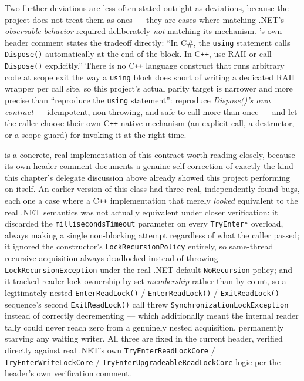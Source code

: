 Two further deviations are less often stated outright as deviations, because the project
does not treat them as ones --- they are cases where matching .NET's \emph{observable
behavior} required deliberately \emph{not} matching its mechanism. 's
own header comment states the tradeoff directly: ``In C\#, the \texttt{using} statement calls
\texttt{Dispose()} automatically at the end of the block. In C\texttt{++}, use RAII or call
\texttt{Dispose()} explicitly.'' There is no C\texttt{++} language construct that runs
arbitrary code at scope exit the way a \texttt{using} block does short of writing a dedicated
RAII wrapper per call site, so this project's actual parity target is narrower and more
precise than ``reproduce the \texttt{using} statement'': reproduce \emph{Dispose()'s own
contract} --- idempotent, non-throwing, and safe to call more than once --- and let the
caller choose their own C\texttt{++}-native mechanism (an explicit call, a destructor, or a
scope guard) for invoking it at the right time.

 is a concrete, real implementation of this
contract worth reading closely, because its own header comment documents a genuine
self-correction of exactly the kind this chapter's delegate discussion above already showed
this project performing on itself. An earlier version of this
class had three real, independently-found bugs, each one a case where a C\texttt{++}
implementation that merely \emph{looked} equivalent to the real .NET semantics was not
actually equivalent under closer verification: it discarded the
\texttt{millisecondsTimeout} parameter on every \texttt{TryEnter*} overload, always making a
single non-blocking attempt regardless of what the caller passed; it ignored the constructor's
\texttt{LockRecursionPolicy} entirely, so same-thread recursive acquisition always deadlocked
instead of throwing \texttt{LockRecursionException} under the real .NET-default
\texttt{NoRecursion} policy; and it tracked reader-lock ownership by set \emph{membership}
rather than by count, so a legitimately nested
\texttt{EnterReadLock()} / \texttt{EnterReadLock()} / \texttt{ExitReadLock()} sequence's second
\texttt{ExitReadLock()} call threw \texttt{SynchronizationLockException} instead of correctly
decrementing --- which additionally meant the internal reader tally could never reach zero
from a genuinely nested acquisition, permanently starving any waiting writer. All three are
fixed in the current header, verified directly against real .NET's own
\texttt{TryEnterReadLockCore} / \texttt{TryEnterWriteLockCore} / \texttt{TryEnterUpgradeableReadLockCore}
logic per the header's own verification comment.

